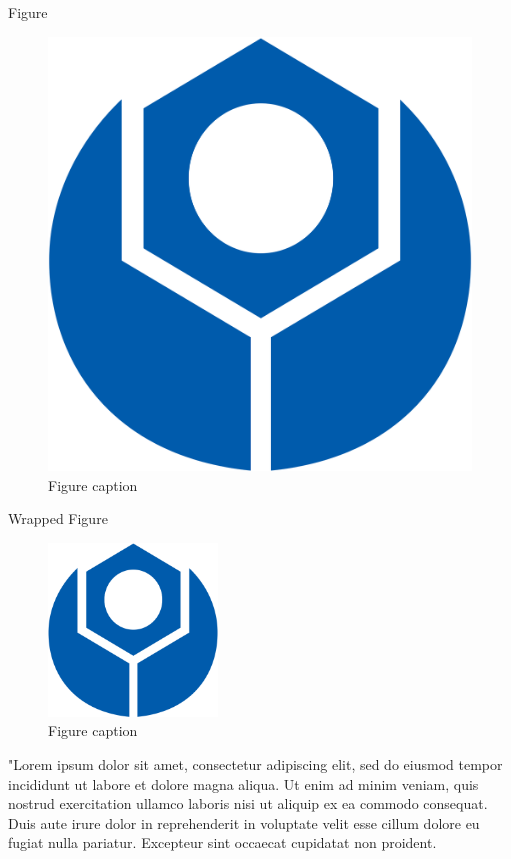 \documentclass[aspectratio=169,xcolor=dvipsnames, t]{beamer}
\begin{document}
    \begin{frame}{Figure}
        \begin{figure}
            \includegraphics[height=0.5\paperheight]{theme/ntust/ntust-logo-icon.png}
            \caption{Figure caption}
        \end{figure}
    \end{frame}

    \begin{frame}{Wrapped Figure}
        \begin{figure}
            \centering
            \includegraphics[width=0.4\textwidth]{theme/ntust/ntust-logo-icon.png}
            \caption{Figure caption}
        \end{figure}
        "Lorem ipsum dolor sit amet, consectetur adipiscing elit, sed do eiusmod tempor incididunt ut labore et dolore magna aliqua. Ut enim ad minim veniam, quis nostrud exercitation ullamco laboris nisi ut aliquip ex ea commodo consequat. Duis aute irure dolor in reprehenderit in voluptate velit esse cillum dolore eu fugiat nulla pariatur. Excepteur sint occaecat cupidatat non proident.
    \end{frame}
\end{document}
